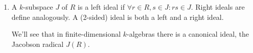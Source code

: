 \begin{enumerate}[label=(\alph*)]
	\item A $k$-subspace $J$ of $R$ is a left ideal if $\forall r \in R, s \in J\colon rs \in J$.
		Right ideals are define analogously. A (2-sided) ideal is both a left and a right
		ideal.

		We'll see that in finite-dimensional $k$-algebras there is a canonical ideal, the
		Jacobson radical $J(R)$.
\end{enumerate}

